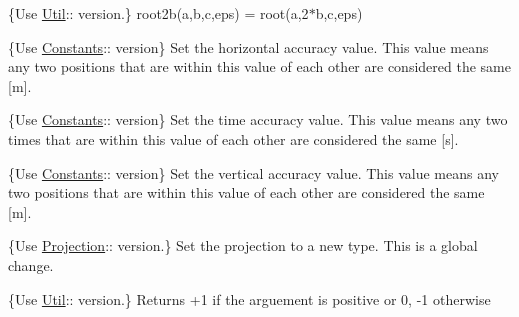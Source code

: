 \begin{DoxyRefList}
%
\{Use \mbox{\hyperlink{classlarcfm_1_1_util}{Util}}\+:\+: version.\} root2b(a,b,c,eps) = root(a,2$\ast$b,c,eps)  
\item[Member \mbox{\hyperlink{namespacelarcfm_ae41c8c0e11bf9ff9757f396e7dd9d2ef}{larcfm\+::set\+\_\+horizontal\+\_\+accuracy}} (double acc)]\label{deprecated__deprecated000005}%
%
\{Use \mbox{\hyperlink{classlarcfm_1_1_constants}{Constants}}\+:\+: version\} Set the horizontal accuracy value. This value means any two positions that are within this value of each other are considered the same \mbox{[}m\mbox{]}.  
\item[Member \mbox{\hyperlink{namespacelarcfm_a18edc2288523879ee25c667c3e504e73}{larcfm\+::set\+\_\+time\+\_\+accuracy}} (double acc)]\label{deprecated__deprecated000004}%
%
\{Use \mbox{\hyperlink{classlarcfm_1_1_constants}{Constants}}\+:\+: version\} Set the time accuracy value. This value means any two times that are within this value of each other are considered the same \mbox{[}s\mbox{]}.  
\item[Member \mbox{\hyperlink{namespacelarcfm_a549428bec75557bcbb9d3091bd043c7b}{larcfm\+::set\+\_\+vertical\+\_\+accuracy}} (double acc)]\label{deprecated__deprecated000006}%
%
\{Use \mbox{\hyperlink{classlarcfm_1_1_constants}{Constants}}\+:\+: version\} Set the vertical accuracy value. This value means any two positions that are within this value of each other are considered the same \mbox{[}m\mbox{]}.  
\item[Member \mbox{\hyperlink{namespacelarcfm_adf0783e94490f8089173b572f461f391}{larcfm\+::set\+Projection\+Type}} (Projection\+Type t)]\label{deprecated__deprecated000020}%
%
\{Use \mbox{\hyperlink{classlarcfm_1_1_projection}{Projection}}\+:\+: version.\} Set the projection to a new type. This is a global change.  
\item[Member \mbox{\hyperlink{namespacelarcfm_a430f7a07d1606fd6f33433406d1f6c32}{larcfm\+::sign}} (const double x)]\label{deprecated__deprecated000034}%
%
\{Use \mbox{\hyperlink{classlarcfm_1_1_util}{Util}}\+:\+: version.\} Returns +1 if the arguement is positive or 0, -\/1 otherwise  
\item[Member \mbox{\hyperlink{namespacelarcfm_a546d9e8b36597c9be672ebc5b43a7b0c}{larcfm\+::sq}} (const double x)]\label{deprecated__deprecated000025}%
%

\end{DoxyRefList}
